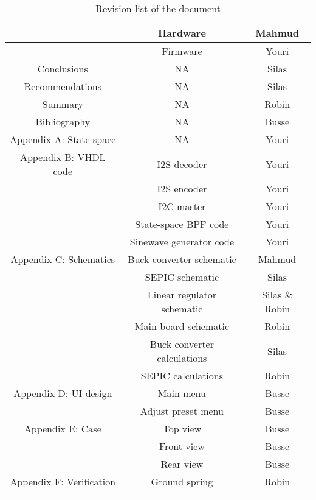 \begin{justify}
\begin{longtable}{|c|c|c|}
								& Hardware						& Mahmud					\\ \hline
								& Firmware						& Youri						\\ \hline
	Conclusions					& NA							& Silas						\\ \hline
	Recommendations				& NA							& Silas						\\ \hline
	Summary						& NA							& Robin						\\ \hline
	Bibliography				& NA							& Busse						\\ \hline
	Appendix A: State-space		& NA							& Youri						\\ \hline
	Appendix B: VHDL code		& I2S decoder					& Youri						\\ \hline
								& I2S encoder					& Youri						\\ \hline
								& I2C master					& Youri						\\ \hline
								& State-space BPF code			& Youri						\\ \hline
								& Sinewave generator code		& Youri						\\ \hline
	Appendix C: Schematics		& Buck converter schematic		& Mahmud					\\ \hline
								& SEPIC schematic				& Silas						\\ \hline
								& Linear regulator schematic	& Silas	\& Robin			\\ \hline
								& Main board schematic			& Robin						\\ \hline
								& Buck converter calculations	& Silas						\\ \hline
								& SEPIC calculations			& Robin						\\ \hline
	Appendix D: UI design		& Main menu						& Busse						\\ \hline
								& Adjust preset menu			& Busse						\\ \hline
	Appendix E: Case			& Top view						& Busse						\\ \hline
								& Front view					& Busse						\\ \hline
								& Rear view						& Busse						\\ \hline
	Appendix F: Verification	& Ground spring					& Robin						\\ \hline

	\caption{Revision list of the document}
	\label{table:revision_history}
\end{longtable}

\newpage
\pagestyle{plain}
\setcounter{page}{1}


\end{justify}
